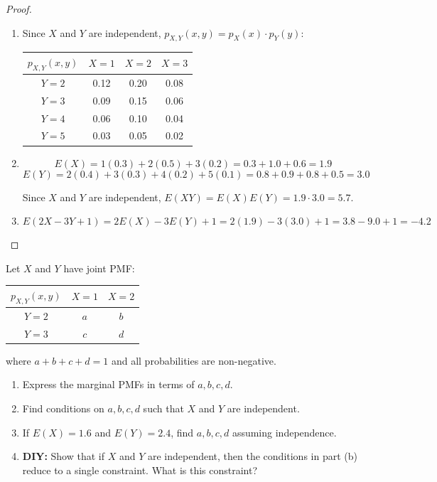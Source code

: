 \begin{proof}
\begin{enumerate}[label=(\alph*)]
    \item Since $X$ and $Y$ are independent, $p_{X,Y}(x, y) = p_X(x) \cdot p_Y(y)$:
    
    \begin{center}
    \renewcommand{\arraystretch}{1.5}
    \begin{tabular}{c|ccc}
    $p_{X,Y}(x,y)$ & $X=1$ & $X=2$ & $X=3$ \\ \hline
    $Y=2$ & 0.12 & 0.20 & 0.08 \\
    $Y=3$ & 0.09 & 0.15 & 0.06 \\
    $Y=4$ & 0.06 & 0.10 & 0.04 \\
    $Y=5$ & 0.03 & 0.05 & 0.02 \\
    \end{tabular}
    \end{center}
    
    \item 
    \[
    E(X) = 1(0.3) + 2(0.5) + 3(0.2) = 0.3 + 1.0 + 0.6 = 1.9
    \]
    \[
    E(Y) = 2(0.4) + 3(0.3) + 4(0.2) + 5(0.1) = 0.8 + 0.9 + 0.8 + 0.5 = 3.0
    \]
    
    Since $X$ and $Y$ are independent, $E(XY) = E(X)E(Y) = 1.9 \cdot 3.0 = 5.7$.
    
    \item 
    \[
    E(2X - 3Y + 1) = 2E(X) - 3E(Y) + 1 = 2(1.9) - 3(3.0) + 1 = 3.8 - 9.0 + 1 = -4.2
    \]
\end{enumerate}
\end{proof}

\begin{exercise}
Let $X$ and $Y$ have joint PMF:

\begin{center}
\renewcommand{\arraystretch}{1.5}
\begin{tabular}{c|cc}
$p_{X,Y}(x,y)$ & $X=1$ & $X=2$ \\ \hline
$Y=2$ & $a$ & $b$ \\
$Y=3$ & $c$ & $d$ \\
\end{tabular}
\end{center}

where $a + b + c + d = 1$ and all probabilities are non-negative.

\begin{enumerate}[label=(\alph*)]
    \item Express the marginal PMFs in terms of $a, b, c, d$.
    \item Find conditions on $a, b, c, d$ such that $X$ and $Y$ are independent.
    \item If $E(X) = 1.6$ and $E(Y) = 2.4$, find $a, b, c, d$ assuming independence.
    \item \textbf{DIY:} Show that if $X$ and $Y$ are independent, then the conditions in part (b) reduce to a single constraint. What is this constraint?
\end{enumerate}
\end{exercise}

